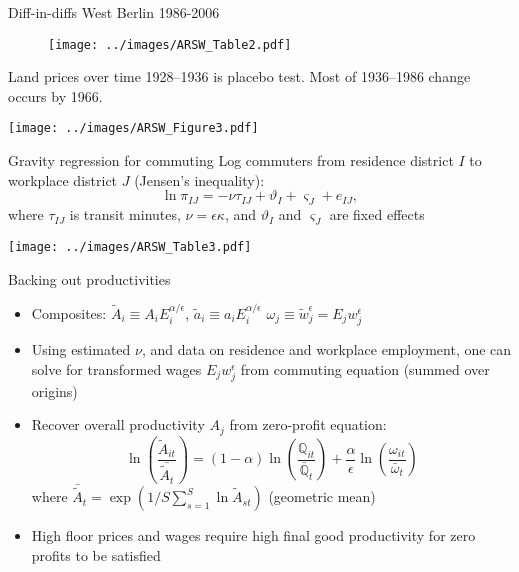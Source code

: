 \documentclass[11pt,notes=hide,aspectratio=169]{beamer}
\begin{document}
\begin{frame}{Diff-in-diffs West Berlin 1986-2006}
\begin{figure}
\centering
\texttt{[image: ../images/ARSW\_Table2.pdf]}
\end{figure}
\end{frame}
\begin{frame}{Land prices over time}
1928--1936 is placebo test.
Most of 1936--1986 change occurs by 1966.
\begin{center}
\texttt{[image: ../images/ARSW\_Figure3.pdf]}
\end{center}
\end{frame}
\begin{frame}{Gravity regression for commuting}
Log commuters from residence district $I$ to workplace district $J$ (Jensen's inequality):
\begin{equation*}
\ln \pi_{IJ} = - \nu \tau_{IJ}  + \vartheta_{I} + \varsigma_{J} + e_{IJ},
\end{equation*}
where $\tau_{IJ}$ is transit minutes, $\nu = \epsilon \kappa$, and 
$\vartheta_{I}$ and  $\varsigma_{J}$ are fixed effects
\begin{center}
\texttt{[image: ../images/ARSW\_Table3.pdf]}
\end{center}
\end{frame}
\begin{frame}{Backing out productivities}
\begin{itemize}
\item Composites:
$\tilde{A}_{i} \equiv A_i E_i^{\alpha/\epsilon}$,
$\tilde{a}_{i} \equiv a_i E_i^{\alpha/\epsilon}$
$\omega_{j} \equiv \tilde{w}_{j}^{\epsilon} = E_j w_{j}^{\epsilon}$
\item Using estimated $\nu$, and data on residence and workplace employment, one can solve for transformed wages $E_j w_{j}^{\epsilon}$ from commuting equation (summed over origins)
\item Recover overall productivity $A_{j}$ from zero-profit equation:
\begin{equation*}
\ln\left(\frac{\tilde{A}_{it}}{\bar{\tilde{A}_{t}}} \right) = (1-\alpha) \ln \left(\frac{\mathbb{Q}_{it}}{\bar{\mathbb{Q}}_t} \right) + \frac{\alpha}{\epsilon} \ln \left(\frac{\omega_{it}}{\bar{\omega}_t} \right)
\end{equation*}
where $\bar{\tilde{A}}_t = \exp(1/S \sum_{s=1}^{S} \ln \tilde{A}_{st})$ (geometric mean)
\item High floor prices and wages require high final good productivity for zero profits to be satisfied 
\end{itemize}
\end{frame}
\end{document}
